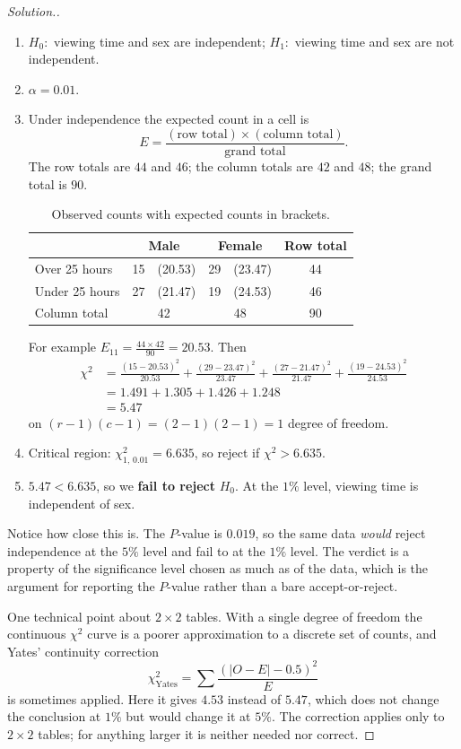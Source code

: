 \documentclass[11pt,a4paper]{article}
\theoremstyle{definition}
\newenvironment{solution}
  {\renewcommand{\qedsymbol}{}\begin{proof}[\textit{Solution}.]}
  {\end{proof}}
\begin{document}
\begin{solution}
\begin{enumerate}
\item $H_0:$ viewing time and sex are independent;
$H_1:$ viewing time and sex are not independent.
\item $\alpha=0.01$.
\item Under independence the expected count in a cell is
\[E=\frac{(\text{row total})\times(\text{column total})}{\text{grand total}}.\]
The row totals are $44$ and $46$; the column totals are $42$ and $48$; the grand total
is $90$.
\begin{table}[H]
\centering
\begin{tabular}{l|cc|c}
& Male & Female & Row total\\
\hline
Over 25 hours & 15\ \ (20.53) & 29\ \ (23.47) & 44\\
Under 25 hours & 27\ \ (21.47) & 19\ \ (24.53) & 46\\
\hline
Column total & 42 & 48 & 90\\
\end{tabular}
\caption{Observed counts with expected counts in brackets.}
\end{table}
For example $E_{11}=\frac{44\times 42}{90}=20.53$. Then
\begin{align*}
\chi^2&=\frac{(15-20.53)^2}{20.53}+\frac{(29-23.47)^2}{23.47}
+\frac{(27-21.47)^2}{21.47}+\frac{(19-24.53)^2}{24.53}\\
&=1.491+1.305+1.426+1.248\\
&=5.47
\end{align*}
on $(r-1)(c-1)=(2-1)(2-1)=1$ degree of freedom.
\item Critical region: $\chi^2_{1,\,0.01}=6.635$, so reject if $\chi^2>6.635$.
\item $5.47<6.635$, so we \textbf{fail to reject} $H_0$. At the $1\%$ level, viewing time
is independent of sex.
\end{enumerate}

Notice how close this is. The $P$-value is $0.019$, so the same data \emph{would} reject
independence at the $5\%$ level and fail to at the $1\%$ level. The verdict is a property of
the significance level chosen as much as of the data, which is the argument for reporting
the $P$-value rather than a bare accept-or-reject.

One technical point about $2\times 2$ tables. With a single degree of freedom the
continuous $\chi^2$ curve is a poorer approximation to a discrete set of counts, and Yates'
continuity correction
\[\chi^2_{\text{Yates}}=\sum\frac{\left(|O-E|-0.5\right)^2}{E}\]
is sometimes applied. Here it gives $4.53$ instead of $5.47$, which does not change the
conclusion at $1\%$ but would change it at $5\%$. The correction applies only to $2\times 2$
tables; for anything larger it is neither needed nor correct.
\end{solution}
\end{document}

